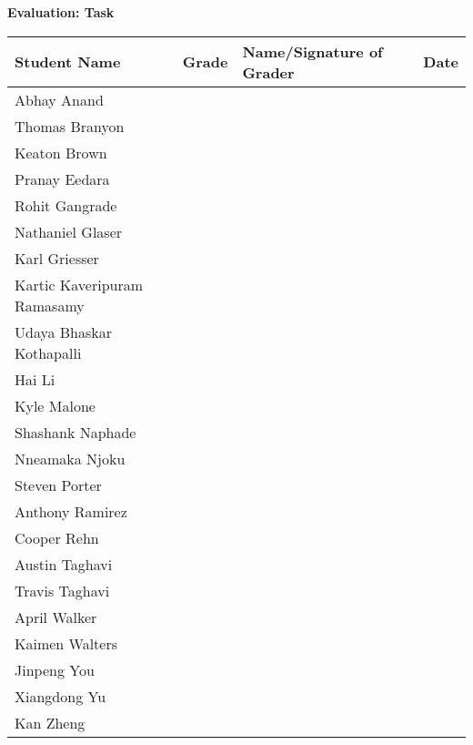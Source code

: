 \documentclass[11pt]{article}
\begin{document}
\begin{center}
{\bfseries \LARGE Evaluation: Task}
\end{center}

\begin{center}
\begin{tabular}{|p{2.25in}|p{0.5in}|p{2.25in}|p{0.5in}|}
\hline
\textbf{Student Name} & \textbf{Grade} & Name/Signature of Grader & Date \\
\hline
Abhay Anand & & & \\ \hline
Thomas Branyon & & & \\ \hline
Keaton Brown & & & \\ \hline
Pranay Eedara & & & \\ \hline
Rohit Gangrade & & & \\ \hline
Nathaniel Glaser & & & \\ \hline
Karl Griesser & & & \\ \hline
Kartic Kaveripuram Ramasamy & & & \\ \hline
Udaya Bhaskar Kothapalli & & & \\ \hline
Hai Li & & & \\ \hline
Kyle Malone & & & \\ \hline
Shashank Naphade & & & \\ \hline
Nneamaka Njoku & & & \\ \hline
Steven Porter & & & \\ \hline
Anthony Ramirez & & & \\ \hline
Cooper Rehn & & & \\ \hline
Austin Taghavi & & & \\ \hline
Travis Taghavi & & & \\ \hline
April Walker & & & \\ \hline
Kaimen Walters & & & \\ \hline
Jinpeng You & & & \\ \hline
Xiangdong Yu & & & \\ \hline
Kan Zheng & & & \\ \hline
\end{tabular}
\end{center}
\end{document}
